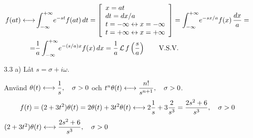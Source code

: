 \begin{task}{3.2}
	\begin{align*}
	f(at)\longleftrightarrow
	&\int_{-\infty}^{+\infty}\! e^{-st}f(at) \, dt=
	\left[\begin{array}{l}
	x=at \\
	dt=dx/a \\
	t=-\infty\leftrightarrow x=-\infty \\
	t=+\infty\leftrightarrow x=+\infty
	\end{array}\right] =
	\int_{-\infty}^{+\infty}\! e^{-sx/a}f(x) \, \frac{dx}{a}= \\ =
	&\frac{1}{a}\int_{-\infty}^{+\infty}\! e^{-(s/a)x}f(x) \, dx=
	\frac{1}{a}\operatorname{\mathcal{L}} f\left(\frac{s}{a}\right)\text{\qquad V.S.V.}
	\end{align*}
\end{task}

\begin{task}{3.3 a)}
	Låt $s=\sigma+i\omega$.
	
	Använd $\theta(t)\longleftrightarrow \dfrac{1}{s}, \quad \sigma > 0$ och $t^n\theta(t)\longleftrightarrow\dfrac{n!}{s^{n+1}}, \quad \sigma > 0$.
	\begin{align*}
	f(t)=
	(2+3t^2)\theta(t)=2\theta(t)+3t^2\theta(t)\longleftrightarrow
	2\frac{1}{s}+3\frac{2}{s^3}=\frac{2s^2+6}{s^3}, \quad \sigma > 0
	\end{align*}
	\ans $(2+3t^2)\theta(t)\longleftrightarrow\dfrac{2s^2+6}{s^3}, \quad \sigma > 0$
\end{task}